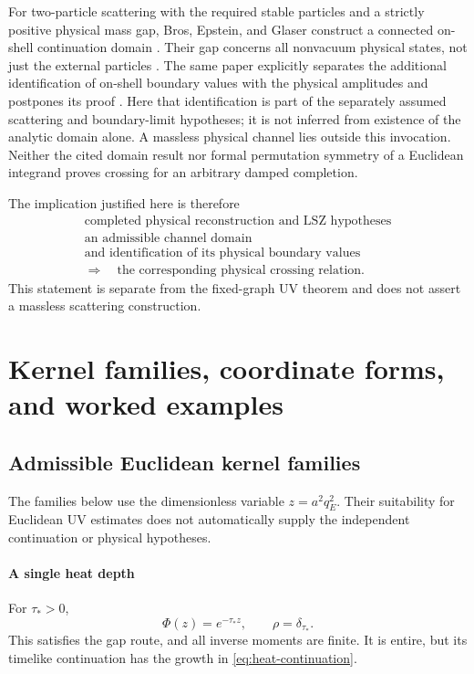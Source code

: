 \documentclass[final,5p,times,twocolumn,numbers,nopreprintline]{elsarticle}
\numberwithin{equation}{section}
\theoremstyle{definition}
\theoremstyle{remark}
\newcommand{\Ph}{\Phi}
\begin{document}
For two-particle scattering with the required stable particles and a
strictly positive physical mass gap, Bros, Epstein, and Glaser construct
a connected on-shell continuation domain \cite{BrosEpsteinGlaser1965}.
Their gap concerns all nonvacuum physical states, not just the external
particles \cite[p.~243]{BrosEpsteinGlaser1965}. The same paper explicitly
separates the additional identification of on-shell boundary values
with the physical amplitudes and postpones its proof
\cite[p.~241]{BrosEpsteinGlaser1965}. Here that identification is part
of the separately assumed scattering and boundary-limit hypotheses;
it is not inferred from existence of the analytic domain alone.
A massless physical channel lies outside this invocation. Neither the
cited domain result nor formal permutation symmetry of a Euclidean
integrand proves crossing for an arbitrary damped completion.

The implication justified here is therefore
\[
 \begin{gathered}
 \text{completed physical reconstruction and LSZ hypotheses}\\
 \text{an admissible channel domain}\\
 \text{and identification of its physical boundary values}\\
 \Longrightarrow\quad
 \text{the corresponding physical crossing relation}.
 \end{gathered}
\]
This statement is separate from the fixed-graph UV theorem and
does not assert a massless scattering construction.

\section{Kernel families, coordinate forms, and worked examples}
\label{sec:examples}

\subsection{Admissible Euclidean kernel families}
\label{sec:kernel-families}

The families below use the dimensionless variable \(z=a^2q_E^2\).
Their suitability for Euclidean UV estimates does not automatically
supply the independent continuation or physical hypotheses.

\paragraph{A single heat depth}
For \(\tau_*>0\),
\begin{equation}
 \Ph(z)=e^{-\tau_*z},\qquad\rho=\delta_{\tau_*}.
 \label{eq:heat-family}
\end{equation}
This satisfies the gap route, and all inverse moments are finite.
It is entire, but its timelike continuation has the growth in
\eqref{eq:heat-continuation}.
\end{document}
